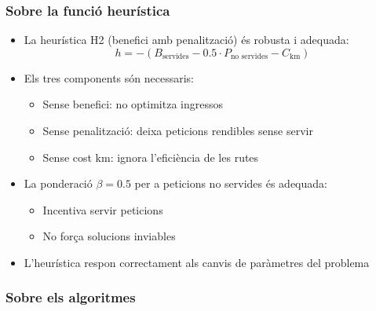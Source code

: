 \subsubsection{Sobre la funció heurística}

\begin{itemize}
    \item La heurística H2 (benefici amb penalització) és robusta i adequada:
    \begin{equation*}
    h = -(B_{\text{servides}} - 0.5 \cdot P_{\text{no servides}} - C_{\text{km}})
    \end{equation*}
    
    \item Els tres components són necessaris:
    \begin{itemize}
        \item Sense benefici: no optimitza ingressos
        \item Sense penalització: deixa peticions rendibles sense servir
        \item Sense cost km: ignora l'eficiència de les rutes
    \end{itemize}
    
    \item La ponderació $\beta=0.5$ per a peticions no servides és adequada:
    \begin{itemize}
        \item Incentiva servir peticions
        \item No força solucions inviables
    \end{itemize}
    
    \item L'heurística respon correctament als canvis de paràmetres del problema
\end{itemize}

\subsubsection{Sobre els algoritmes}

